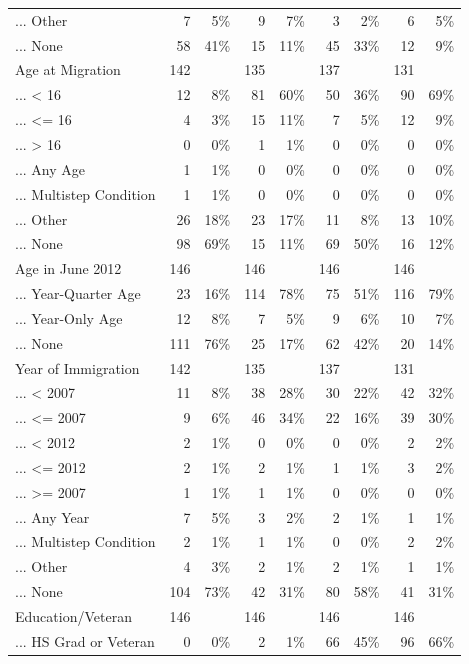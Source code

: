 \documentclass[
  letterpaper,
  DIV=11,
  numbers=noendperiod]{scrartcl}
\begin{document}
\begin{table}[!htbp]
{\begin{tabular}{lrrrrrrrr}
... Other & 7 & 5\% & 9 & 7\% & 3 & 2\% & 6 & 5\% \\ 
... None & 58 & 41\% & 15 & 11\% & 45 & 33\% & 12 & 9\% \\ 
Age at Migration & 142 &  & 135 &  & 137 &  & 131 &  \\ 
... < 16 & 12 & 8\% & 81 & 60\% & 50 & 36\% & 90 & 69\% \\ 
... <= 16 & 4 & 3\% & 15 & 11\% & 7 & 5\% & 12 & 9\% \\ 
... > 16 & 0 & 0\% & 1 & 1\% & 0 & 0\% & 0 & 0\% \\ 
... Any Age & 1 & 1\% & 0 & 0\% & 0 & 0\% & 0 & 0\% \\ 
... Multistep Condition & 1 & 1\% & 0 & 0\% & 0 & 0\% & 0 & 0\% \\ 
... Other & 26 & 18\% & 23 & 17\% & 11 & 8\% & 13 & 10\% \\ 
... None & 98 & 69\% & 15 & 11\% & 69 & 50\% & 16 & 12\% \\ 
Age in June 2012 & 146 &  & 146 &  & 146 &  & 146 &  \\ 
... Year-Quarter Age & 23 & 16\% & 114 & 78\% & 75 & 51\% & 116 & 79\% \\ 
... Year-Only Age & 12 & 8\% & 7 & 5\% & 9 & 6\% & 10 & 7\% \\ 
... None & 111 & 76\% & 25 & 17\% & 62 & 42\% & 20 & 14\% \\ 
Year of Immigration & 142 &  & 135 &  & 137 &  & 131 &  \\ 
... < 2007 & 11 & 8\% & 38 & 28\% & 30 & 22\% & 42 & 32\% \\ 
... <= 2007 & 9 & 6\% & 46 & 34\% & 22 & 16\% & 39 & 30\% \\ 
... < 2012 & 2 & 1\% & 0 & 0\% & 0 & 0\% & 2 & 2\% \\ 
... <= 2012 & 2 & 1\% & 2 & 1\% & 1 & 1\% & 3 & 2\% \\ 
... >= 2007 & 1 & 1\% & 1 & 1\% & 0 & 0\% & 0 & 0\% \\ 
... Any Year & 7 & 5\% & 3 & 2\% & 2 & 1\% & 1 & 1\% \\ 
... Multistep Condition & 2 & 1\% & 1 & 1\% & 0 & 0\% & 2 & 2\% \\ 
... Other & 4 & 3\% & 2 & 1\% & 2 & 1\% & 1 & 1\% \\ 
... None & 104 & 73\% & 42 & 31\% & 80 & 58\% & 41 & 31\% \\ 
Education/Veteran & 146 &  & 146 &  & 146 &  & 146 &  \\ 
... HS Grad or Veteran & 0 & 0\% & 2 & 1\% & 66 & 45\% & 96 & 66\% \\ 

\end{tabular}}
\end{table}
\end{document}
